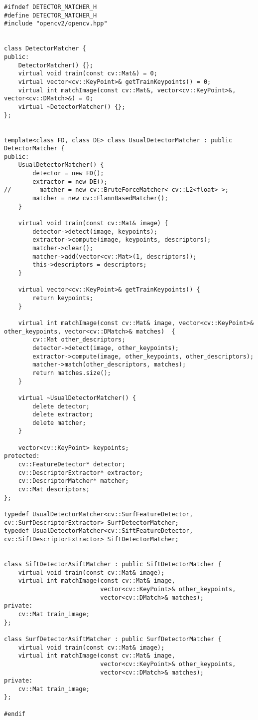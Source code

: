 \begin{lstlisting}
#ifndef DETECTOR_MATCHER_H
#define DETECTOR_MATCHER_H
#include "opencv2/opencv.hpp"


class DetectorMatcher {
public:
	DetectorMatcher() {};
	virtual void train(const cv::Mat&) = 0;
	virtual vector<cv::KeyPoint>& getTrainKeypoints() = 0;
	virtual int matchImage(const cv::Mat&, vector<cv::KeyPoint>&, vector<cv::DMatch>&) = 0;
	virtual ~DetectorMatcher() {};
};


template<class FD, class DE> class UsualDetectorMatcher : public DetectorMatcher {
public:
	UsualDetectorMatcher() {
		detector = new FD();
		extractor = new DE();
//        matcher = new cv::BruteForceMatcher< cv::L2<float> >;
        matcher = new cv::FlannBasedMatcher();
	}
	
	virtual void train(const cv::Mat& image) {	
		detector->detect(image, keypoints);
		extractor->compute(image, keypoints, descriptors);	
        matcher->clear();
		matcher->add(vector<cv::Mat>(1, descriptors));
        this->descriptors = descriptors;
	}
	
	virtual vector<cv::KeyPoint>& getTrainKeypoints() {
		return keypoints;
	}
	
	virtual int matchImage(const cv::Mat& image, vector<cv::KeyPoint>& other_keypoints, vector<cv::DMatch>& matches)  {
		cv::Mat other_descriptors;
		detector->detect(image, other_keypoints);
        extractor->compute(image, other_keypoints, other_descriptors);
        matcher->match(other_descriptors, matches);
		return matches.size();
	}
    
	virtual ~UsualDetectorMatcher() {
		delete detector;
		delete extractor;
		delete matcher;
	}
    
    vector<cv::KeyPoint> keypoints;
protected:
	cv::FeatureDetector* detector;
	cv::DescriptorExtractor* extractor;
	cv::DescriptorMatcher* matcher;
    cv::Mat descriptors;
};

typedef UsualDetectorMatcher<cv::SurfFeatureDetector, cv::SurfDescriptorExtractor> SurfDetectorMatcher;
typedef UsualDetectorMatcher<cv::SiftFeatureDetector, cv::SiftDescriptorExtractor> SiftDetectorMatcher;


class SiftDetectorAsiftMatcher : public SiftDetectorMatcher {
    virtual void train(const cv::Mat& image);
    virtual int matchImage(const cv::Mat& image, 
                           vector<cv::KeyPoint>& other_keypoints, 
                           vector<cv::DMatch>& matches);
private:
    cv::Mat train_image;
};

class SurfDetectorAsiftMatcher : public SurfDetectorMatcher {
    virtual void train(const cv::Mat& image);
    virtual int matchImage(const cv::Mat& image, 
                           vector<cv::KeyPoint>& other_keypoints, 
                           vector<cv::DMatch>& matches);
private:
    cv::Mat train_image;
};

#endif
\end{lstlisting}
